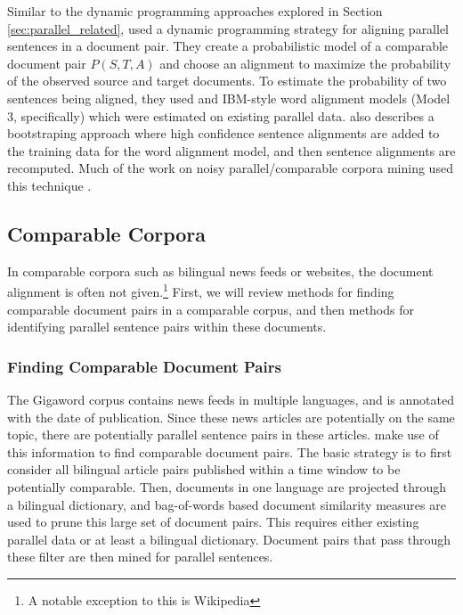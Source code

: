 Similar to the dynamic programming approaches explored in Section
\ref{sec:parallel_related}, \citet{Zhao02} used a dynamic programming strategy
for aligning parallel sentences in a document pair. They create a probabilistic
model of a comparable document pair $P(S,T,A)$ and choose an alignment to
maximize the probability of the observed source and target documents. To
estimate the probability of two sentences being aligned, they used and IBM-style 
word alignment models (Model 3, specifically) which were estimated on existing
parallel data. \citet{Zhao02} also describes a bootstraping approach where high
confidence sentence alignments are added to the training data for the word
alignment model, and then sentence alignments are recomputed. Much of the work
on noisy parallel/comparable corpora mining used this technique 
\citep{Fung04a,Fung04b,Wu05,Munteanu05}.

\subsection{Comparable Corpora}
\label{sec:nonnoisy_related}
In comparable corpora such as bilingual news feeds or websites, the document
alignment is often not given.\footnote{A notable exception to this is Wikipedia}
First, we will review methods for finding comparable document pairs in a
comparable corpus, and then methods for identifying parallel sentence pairs
within these documents.

\subsubsection{Finding Comparable Document Pairs}
The Gigaword corpus contains news feeds in multiple languages, and is annotated
with the date of publication. Since these news articles are potentially on the
same topic, there are potentially parallel sentence pairs in these articles.
\citet{Munteanu04,Munteanu05, Fung04a, Fung04b} make use of this information to
find comparable document pairs. The basic strategy is to first consider all
bilingual article pairs published within a time window to be potentially
comparable. Then, documents in one language are projected through a bilingual
dictionary, and bag-of-words based document similarity measures are used to
prune this large set of document pairs. This requires either existing parallel
data or at least a bilingual dictionary. Document pairs that pass through these
filter are then mined for parallel sentences.


